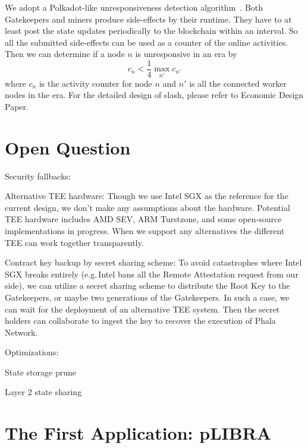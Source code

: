 We adopt a Polkadot-like unresponsiveness detection algorithm~\cite{polkadotslashing}. Both Gatekeepers and miners produce side-effects by their runtime. They have to at least post the state updates periodically to the blockchain within an interval. So all the submitted side-effects can be used as a counter of the online activities. Then we can determine if a node $n$ is unresponsive in an era by
$$
    c_n < \frac{1}{4} \max\limits_{n'}{c_{n'}}
$$
where $c_n$ is the activity counter for node $n$ and $n'$ is all the connected worker nodes in the era. For the detailed design of slash, please refer to Economic Design Paper.


\section{Open Question}

Security fallbacks:

\begin{icompact}
    \item Alternative TEE hardware: Though we use Intel SGX as the reference for the current design, we don't make any assumptions about the hardware. Potential TEE hardware includes AMD SEV, ARM Turstzone, and some open-source implementations in progress. When we support any alternatives the different TEE can work together transparently.
    \item Contract key backup by secret sharing scheme: To avoid catastrophes where Intel SGX breaks entirely (e.g.\,Intel bans all the Remote Attestation request from our side), we can utilize a secret sharing scheme to distribute the Root Key to the Gatekeepers, or maybe two generations of the Gatekeepers. In such a case, we can wait for the deployment of an alternative TEE system. Then the secret holders can collaborate to ingest the key to recover the execution of Phala Network.
\end{icompact}

Optimizations:

\begin{icompact}
    \item State storage prune
    \item Layer 2 state sharing
\end{icompact}


\section{The First Application: pLIBRA}

